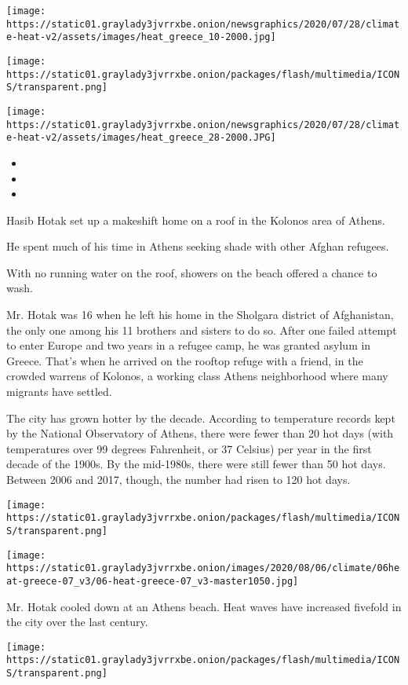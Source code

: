\texttt{[image: https://static01.graylady3jvrrxbe.onion/newsgraphics/2020/07/28/climate-heat-v2/assets/images/heat\_greece\_10-2000.jpg]}

\texttt{[image: https://static01.graylady3jvrrxbe.onion/packages/flash/multimedia/ICONS/transparent.png]}

\texttt{[image: https://static01.graylady3jvrrxbe.onion/newsgraphics/2020/07/28/climate-heat-v2/assets/images/heat\_greece\_28-2000.JPG]}

\begin{itemize}
\item
\item
\item
\end{itemize}

Hasib Hotak set up a makeshift home on a roof in the Kolonos area of
Athens.

He spent much of his time in Athens seeking shade with other Afghan
refugees.

With no running water on the roof, showers on the beach offered a chance
to wash.

Mr. Hotak was 16 when he left his home in the Sholgara district of
Afghanistan, the only one among his 11 brothers and sisters to do so.
After one failed attempt to enter Europe and two years in a refugee
camp, he was granted asylum in Greece. That's when he arrived on the
rooftop refuge with a friend, in the crowded warrens of Kolonos, a
working class Athens neighborhood where many migrants have settled.

The city has grown hotter by the decade. According to temperature
records kept by the National Observatory of Athens, there were fewer
than 20 hot days (with temperatures over 99 degrees Fahrenheit, or 37
Celsius) per year in the first decade of the 1900s. By the mid-1980s,
there were still fewer than 50 hot days. Between 2006 and 2017, though,
the number had risen to 120 hot days.

\texttt{[image: https://static01.graylady3jvrrxbe.onion/packages/flash/multimedia/ICONS/transparent.png]}

\texttt{[image: https://static01.graylady3jvrrxbe.onion/images/2020/08/06/climate/06heat-greece-07\_v3/06-heat-greece-07\_v3-master1050.jpg]}

Mr. Hotak cooled down at an Athens beach. Heat waves have increased
fivefold in the city over the last century.

\texttt{[image: https://static01.graylady3jvrrxbe.onion/packages/flash/multimedia/ICONS/transparent.png]}

